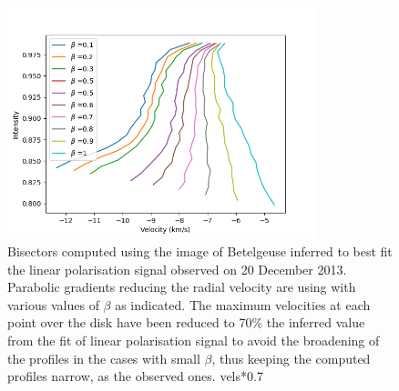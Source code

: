 \documentclass{/Users/art2/TeX/aanda/aa}
\begin{document}
\begin{figure}
   \includegraphics[width=0.8\textwidth]{Bisectors_cual1.png}
   \caption{ }
   \caption{Bisectors computed using the image of Betelgeuse inferred to best fit the linear polarisation signal observed on 20 December 2013. Parabolic 
   gradients reducing the radial velocity are using with various values of $\beta$ as indicated. The maximum velocities at each point over the disk
   have been reduced to 70\%  the inferred value from the fit of linear polarisation signal to avoid the broadening of the profiles in the cases with 
   small $\beta$, thus keeping the computed profiles narrow, as the observed ones. 
    vels*0.7}
   \label{bisector1}
   \end{figure}
\end{document}
